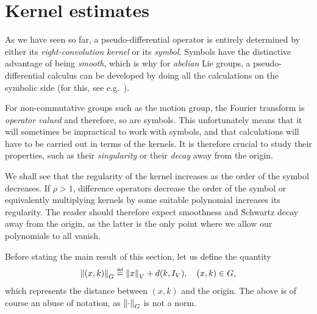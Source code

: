 \section{Kernel estimates}

As we have seen so far,
a pseudo-differential operator is entirely determined by either its \emph{right-convolution kernel} or its \emph{symbol}.
Symbols have the distinctive advantage of being \emph{smooth},
which is why for \emph{abelian} Lie groups,
a pseudo-differential calculus can be developed by doing all the calculations on the symbolic side
(for this, see e.g.\ \cite{RuzhanskyTurunen10}).

For non-commutative groups such as the motion group,
the Fourier transform is \emph{operator valued} and therefore, so are symbols.
This unfortunately means that it will sometimes be impractical to work with symbols,
and that calculations will have to be carried out in terms of the kernels.
It is therefore crucial to study their properties,
such as their \emph{singularity} or their \emph{decay} away from the origin.

We shall see that the regularity of the kernel increases
as the order of the symbol decreases.
If $\rho > 1$, difference operators decrease the order of the symbol
or equivalently multiplying kernels by some suitable polynomial increases its regularity.
The reader should therefore expect smoothness and Schwartz decay away from the origin,
as the latter is the only point where we allow our polynomials to all vanish.

Before stating the main result of this section,
let us define the quantity
\begin{align*}
    \norm [\Group] {(x, k)} \defeq \norm {x} + d(k, \Id{\VectorSpace}), \quad (x, k) \in \Group,
\end{align*}
which represents the distance between $(x, k)$ and the origin.
The above is of course an abuse of notation, as $\norm [\Group] \dummy$ is not a norm.

